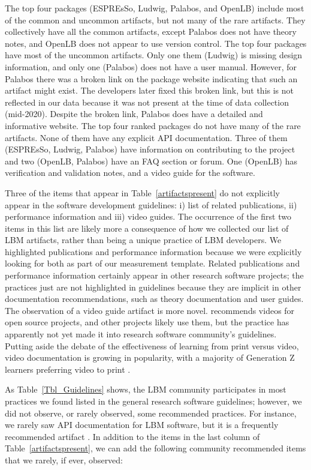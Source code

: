 \documentclass[final, 3p, times, authoryear]{elsarticle}
\begin{document}
The top four packages (ESPREsSo, Ludwig, Palabos, and OpenLB) include most of
the common and uncommon artifacts, but not many of the rare artifacts.  They
collectively have all the common artifacts, except Palabos does not have theory
notes, and OpenLB does not appear to use version control.  The top four packages
have most of the uncommon artifacts. Only one them (Ludwig) is missing design
information, and only one (Palabos) does not have a user manual.  However, for
Palabos there was a broken link on the package website indicating that such an
artifact might exist. The developers later fixed this broken link, but this is
not reflected in our data because it was not present at the time of data
collection (mid-2020). Despite the broken link, Palabos does have a detailed and
informative website. The top four ranked packages do not have many of the rare
artifacts. None of them have any explicit API documentation. Three of them
(ESPREsSo, Ludwig, Palabos) have information on contributing to the project and
two (OpenLB, Palabos) have an FAQ section or forum. One (OpenLB) has
verification and validation notes, and a video guide for the software. 

Three of the items that appear in Table~\ref{artifactspresent} do not explicitly
appear in the software development guidelines: i) list of related publications,
ii) performance information and iii) video guides.  The occurrence of the first
two items in this list are likely more a consequence of how we collected our
list of LBM artifacts, rather than being a unique practice of LBM developers. We
highlighted publications and performance information because we were explicitly
looking for both as part of our measurement template. Related
publications and performance information certainly appear in other research
software projects; the practices just are not highlighted in guidelines because
they are implicit in other documentation recommendations, such as theory
documentation and user guides. The observation of a video guide artifact is more
novel.  \citet{Fogel2005} recommends videos for open source projects, and other
projects likely use them, but the practice has apparently not yet made it into
research software community's guidelines.  Putting aside the debate of the
effectiveness of learning from print versus video, video documentation is
growing in popularity, with a majority of Generation Z learners preferring video
to print \citep{Genota2018}.

As Table~\ref{Tbl_Guidelines} shows, the LBM community participates in most
practices we found listed in the general research software guidelines; however,
we did not observe, or rarely observed, some recommended practices. For
instance, we rarely saw API documentation for LBM software, but it is a
frequently recommended artifact \citep{SmithAndRoscoe2018, ThielEtAl2020,
vanGompelEtAl2016, OrvizEtAl2017, SSI2022, Zadka2018}.  In addition to the items
in the last column of Table~\ref{artifactspresent}, we can add the following
community recommended items that we rarely, if ever, observed:
\end{document}
